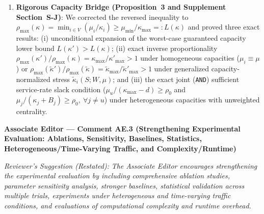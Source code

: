 \documentclass[11pt,a4paper]{article}
\newcommand{\cbox}[2]{%
  \vspace{0.6em}\noindent\textbf{#1}\par\smallskip
  \noindent\textit{Reviewer's Suggestion (Restated):} \textit{#2}\par\smallskip
}
\begin{document}
\begin{enumerate}[leftmargin=1.8em]
    \item \textbf{Rigorous Capacity Bridge (Proposition~3 and Supplement Section~S-J)}: We corrected the reversed inequality to $\rho_{\max}(\kappa) = \min_{i\in V}(\mu_i/\kappa_i) \ge \mu_{\min}/\kappa_{\max} =: L(\kappa)$ and proved three exact results: (i) unconditional expansion of the worst-case guaranteed capacity lower bound $L(\kappa') > L(\kappa)$; (ii) exact inverse proportionality $\rho_{\max}(\kappa')/\rho_{\max}(\kappa) = \kappa_{\max}/\kappa'_{\max} > 1$ under homogeneous capacities ($\mu_i \equiv \mu$) or $\rho_{\max}(\widetilde{\kappa}')/\rho_{\max}(\widetilde{\kappa}) = \widetilde{\kappa}_{\max}/\widetilde{\kappa}'_{\max} > 1$ under generalized capacity-normalized stress $\widetilde{\kappa}_i(S;W,\mu)$; and (iii) the exact joint (\texttt{AND}) sufficient service-rate slack condition ($\mu_u/(\kappa_{\max}-d)\ge\rho_0$ and $\mu_j/(\kappa_j+B_j)\ge\rho_0,\ \forall j\neq u$) under heterogeneous capacities with unweighted centrality.
\end{enumerate}

\hrulefill

\cbox{Associate Editor --- Comment AE.3 (Strengthening Experimental Evaluation: Ablations, Sensitivity, Baselines, Statistics, Heterogeneous/Time-Varying Traffic, and Complexity/Runtime)}{The Associate Editor encourages strengthening the experimental evaluation by including comprehensive ablation studies, parameter sensitivity analysis, stronger baselines, statistical validation across multiple trials, experiments under heterogeneous and time-varying traffic conditions, and evaluations of computational complexity and runtime overhead.}
\end{document}
